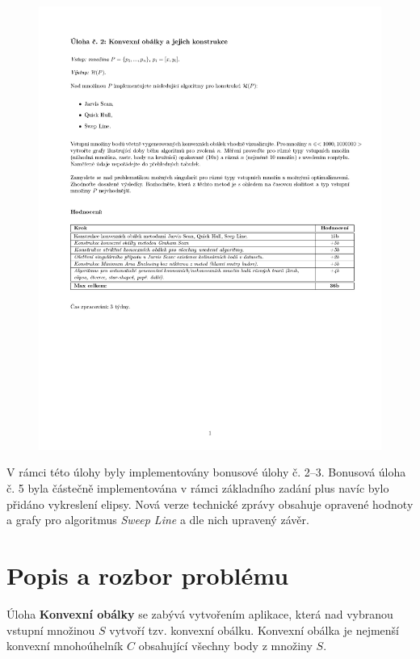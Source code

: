 \documentclass[a4paper, 12pt]{article}
\begin{document}
\begin{figure}[h!]
	\includegraphics[clip, trim=0cm 10cm 0cm 3cm, width=1.0\textwidth]{./pictures/zadani02.pdf}
\end{figure}

V rámci této úlohy byly implementovány bonusové úlohy č. 2–3. Bonusová úloha č. 5 byla částečně implementována v rámci základního zadání plus navíc bylo přidáno vykreslení elipsy. Nová verze technické zprávy obsahuje opravené hodnoty a grafy pro algoritmus \textit{Sweep Line} a dle nich upravený závěr.
\clearpage

\section{Popis a rozbor problému}
Úloha \textbf{Konvexní obálky} se zabývá vytvořením aplikace, která nad vybranou vstupní množinou $S$ vytvoří tzv. konvexní obálku. Konvexní obálka je nejmenší konvexní mnoho\-úhelník $C$ obsahující všechny body z množiny $S$.\\ 
\end{document}
